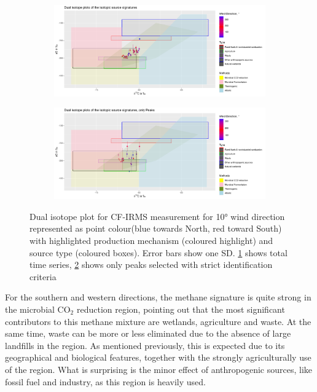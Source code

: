 \begin{figure}
\centering
\begin{subfigure}[b]{1\textwidth}
   \includegraphics[width=1\linewidth]{figures/Appendix/Keeling/12_Keeling_Total_Wind_medium_peaks.png}
   \caption{}
   \label{DualIsotiotopeTotal} 
\end{subfigure}

\begin{subfigure}[b]{1\textwidth}
   \includegraphics[width=1\linewidth]{figures/Appendix/Keeling/12_Keeling_Peaks_Wind_medium_peaks.png}
   \caption{}
   \label{DualIsotiotopeMediumPeaks}
\end{subfigure}
\caption[Dual isotope plot with strict peak identification]{Dual isotope plot for CF-IRMS measurement for 10° wind direction represented as point colour(blue towards North, red toward South) with highlighted production mechanism (coloured highlight) and source type (coloured boxes). Error bars show one SD. \cref{DualIsotiotopeTotal} shows total time series, \cref{DualIsotiotopeMediumPeaks} shows only peaks selected with strict identification criteria}
\label{DualIsotiotopePlots}
\end{figure}
For the southern and western directions, the methane signature is quite strong in the microbial CO$_2$ reduction region, pointing out that the most significant contributors to this methane mixture are wetlands, agriculture and waste. At the same time, waste can be more or less eliminated due to the absence of large landfills in the region. As mentioned previously, this is expected due to its geographical and biological features, together with the strongly agriculturally use of the region. What is surprising is the minor effect of anthropogenic sources, like fossil fuel and industry, as this region is heavily used.\\
